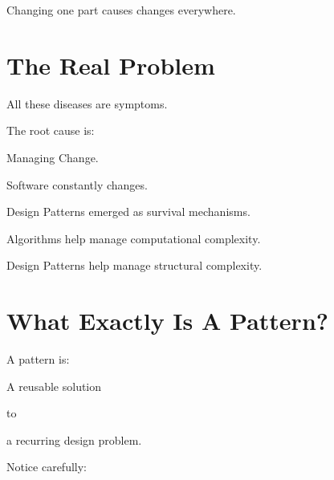 \documentclass[11pt,a4paper]{book}
\begin{document}
Changing one part causes
changes everywhere.


\section{The Real Problem}

All these diseases are symptoms.


The root cause is:


Managing Change.


Software constantly changes.


Design Patterns emerged as
survival mechanisms.


\begin{mentalmodel}

Algorithms help manage
computational complexity.


Design Patterns help manage
structural complexity.

\end{mentalmodel}


\section{What Exactly Is A Pattern?}

A pattern is:


A reusable solution

to

a recurring design problem.


Notice carefully:

\end{document}
